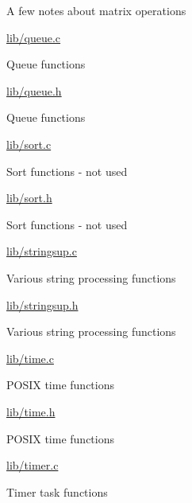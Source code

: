 {\begin{DoxyItemize}
\begin{DoxyItemize}
\begin{DoxyItemize}
\item A few notes about matrix operations
\end{DoxyItemize}
\item \hyperlink{queue_8c}{lib/queue.\+c}
\begin{DoxyItemize}
\item Queue functions
\end{DoxyItemize}
\item \hyperlink{queue_8h}{lib/queue.\+h}
\begin{DoxyItemize}
\item Queue functions
\end{DoxyItemize}
\item \hyperlink{sort_8c}{lib/sort.\+c}
\begin{DoxyItemize}
\item Sort functions -\/ not used
\end{DoxyItemize}
\item \hyperlink{sort_8h}{lib/sort.\+h}
\begin{DoxyItemize}
\item Sort functions -\/ not used
\end{DoxyItemize}
\item \hyperlink{stringsup_8c}{lib/stringsup.\+c}
\begin{DoxyItemize}
\item Various string processing functions
\end{DoxyItemize}
\item \hyperlink{stringsup_8h}{lib/stringsup.\+h}
\begin{DoxyItemize}
\item Various string processing functions
\end{DoxyItemize}
\item \hyperlink{time_8c}{lib/time.\+c}
\begin{DoxyItemize}
\item P\+O\+S\+IX time functions
\end{DoxyItemize}
\item \hyperlink{time_8h}{lib/time.\+h}
\begin{DoxyItemize}
\item P\+O\+S\+IX time functions
\end{DoxyItemize}
\item \hyperlink{timer_8c}{lib/timer.\+c}
\begin{DoxyItemize}
\item Timer task functions
\end{DoxyItemize}

\end{DoxyItemize}
\end{DoxyItemize}}
